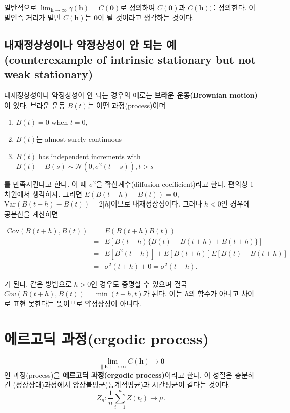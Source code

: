 \documentclass[b5paper,]{scrbook}
\providecommand{\tightlist}{%
  \setlength{\itemsep}{0pt}\setlength{\parskip}{0pt}}
\theoremstyle{plain}
\theoremstyle{definition}
\numberwithin{equation}{section}
\begin{document}
일반적으로
\(\lim_{\mathbf{h}\rightarrow \infty}\gamma(\mathbf{h})=C(\mathbf{0})\)로
정의하여 \(C(\mathbf{0})\)과 \(C(\mathbf{h})\)를 정의한다. 이 말인즉
거리가 멀면 \(C(\mathbf{h})\)는 \(\mathbf{0}\)이 될 것이라고 생각하는
것이다.

\subsection{내재정상성이나 약정상성이 안 되는 예(counterexample of
intrinsic stationary but not weak
stationary)}\label{----counterexample-of-intrinsic-stationary-but-not-weak-stationary}

내재정상성이나 약정상성이 안 되는 경우의 예로는 \textbf{브라운
운동(Brownian motion)}이 있다. 브라운 운동 \(B(t)\)는 어떤
과정(process)이며

\begin{enumerate}
\def\labelenumi{\arabic{enumi}.}
\tightlist
\item
  \(B(t)=0\) when \(t=0\),
\item
  \(B(t)\)는 almost surely continuous
\item
  \(B(t)\) has independent increments with
  \(B(t)-B(s) \sim \mathcal{N}(0,\sigma^{2}(t-s)), t>s\)
\end{enumerate}

를 만족시킨다고 한다. 이 때 \(\sigma^{2}\)을 확산계수(diffusion
coefficient)라고 한다. 편의상 1차원에서 생각하자. 그러면
\(E(B(t+h)-B(t))=0\), \(\text{Var}(B(t+h)-B(t))=2|h|\)이므로
내재정상성이다. 그러나 \(h < 0\)인 경우에 공분산을 계산하면

\begin{eqnarray}
\text{Cov}(B(t+h),B(t)) &=& E(B(t+h)B(t))\nonumber\\
&=&E[B(t+h)\{B(t)-B(t+h)+B(t+h)\}]\nonumber\\
&=&E[B^{2}(t+h)]+E[B(t+h)]E[B(t)-B(t+h)]\nonumber\\
&=&\sigma^{2}(t+h)+0=\sigma^{2}(t+h).
\end{eqnarray}

가 된다. 같은 방법으로 \(h > 0\)인 경우도 증명할 수 있으며 결국
\(Cov(B(t+h),B(t))=\min (t+h,t)\)가 된다. 이는 \(h\)의 함수가 아니고
차이로 표현 못한다는 뜻이므로 약정상성이 아니다.

\section{에르고딕 과정(ergodic process)}\label{-ergodic-process}

\[\lim_{\|\mathbf{h}\| \rightarrow \infty}C(\mathbf{h}) \rightarrow \mathbf{0}\]
인 과정(process)을 \textbf{에르고딕 과정(ergodic process)}이라고 한다.
이 성질은 충분히 긴 (정상상태)과정에서 앙상블평균(통계적평균)과
시간평균이 같다는 것이다.
\[\bar{Z}_{n}:\frac{1}{n}\sum_{i=1}^{n}Z(t_{i}) \rightarrow \mu .\]
\end{document}

